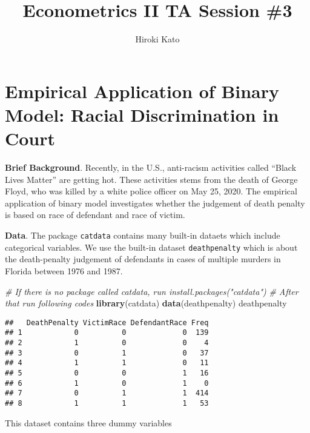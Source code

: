 \documentclass[
  12pt,
]{article}
\title{Econometrics II TA Session \#3}
\author{Hiroki Kato}
\date{}
\newenvironment{Shaded}{\begin{snugshade}}{\end{snugshade}}
\newcommand{\CommentTok}[1]{\textcolor[rgb]{0.56,0.35,0.01}{\textit{#1}}}
\newcommand{\KeywordTok}[1]{\textcolor[rgb]{0.13,0.29,0.53}{\textbf{#1}}}
\newcommand{\NormalTok}[1]{#1}
\begin{document}
\maketitle

\hypertarget{empirical-application-of-binary-model-racial-discrimination-in-court}{%
\section{Empirical Application of Binary Model: Racial Discrimination in
Court}\label{empirical-application-of-binary-model-racial-discrimination-in-court}}

\textbf{Brief Background}. Recently, in the U.S., anti-racism activities
called ``Black Lives Matter'' are getting hot. These activities stems
from the death of George Floyd, who was killed by a white police officer
on May 25, 2020. The empirical application of binary model investigates
whether the judgement of death penalty is based on race of defendant and
race of victim.

\noindent \textbf{Data}. The package \texttt{catdata} contains many
built-in dataets which include categorical variables. We use the
built-in dataset \texttt{deathpenalty} which is about the death-penalty
judgement of defendants in cases of multiple murders in Florida between
1976 and 1987.

\begin{Shaded}
\begin{Highlighting}[]
\CommentTok{\# If there is no package called \textquotesingle{}catdata\textquotesingle{}, run \textquotesingle{}install.packages("catdata")\textquotesingle{}}
\CommentTok{\# After that run following codes}
\KeywordTok{library}\NormalTok{(catdata)}
\KeywordTok{data}\NormalTok{(deathpenalty)}
\NormalTok{deathpenalty}
\end{Highlighting}
\end{Shaded}

\begin{verbatim}
##   DeathPenalty VictimRace DefendantRace Freq
## 1            0          0             0  139
## 2            1          0             0    4
## 3            0          1             0   37
## 4            1          1             0   11
## 5            0          0             1   16
## 6            1          0             1    0
## 7            0          1             1  414
## 8            1          1             1   53
\end{verbatim}

This dataset contains three dummy variables
\end{document}
